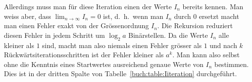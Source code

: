 Allerdings muss man für diese Iteration einen der Werte $I_n$ bereits
kennen.
Man weiss aber, dass $\lim_{n\to\infty} I_n=0$ ist, d.~h.~wenn man
$I_n$ durch $0$ ersetzt macht man einen Fehler exakt von der
Grössenordnung $I_n$.
Die Rekursion reduziert diesen Fehler in jedem Schritt um $\log_2a$
Binärstellen.
Da die Werte $I_n$ alle kleiner als $1$ sind, macht man also
niemals einen Fehler grösser als $1$ und nach $k$ Rückwärtsiterationsschritten
ist der Fehler kleiner als $a^k$.
Man kann also selbst ohne die Kenntnis eines Startwertes ausreichend
genaue Werte von $I_n$ bestimmen.
Dies ist in der dritten Spalte von Tabelle~\ref{buch:table:Iiteration}
durchgeführt.





